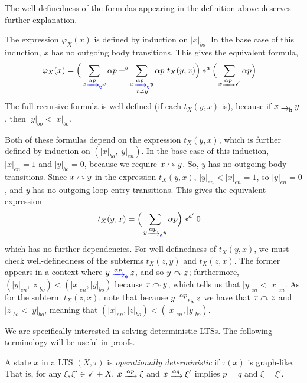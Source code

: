 \documentclass[orivec,envcountsect,envcountsame]{llncs}
\begin{document}
The well-definedness of the formulas appearing in the definition above deserves further explanation.

The expression \(\varphi_X(x)\) is defined by induction on \(|x|_{bo}\).
In the base case of this induction, \(x\) has no outgoing body transitions.
This gives the equivalent formula,
\begin{align*}
	\varphi_X(x)
	&= \Big(\sum_{x \etr{\alpha p} x} \alpha p +^b \sum_{\substack{x \etr{\alpha p} y\\x\neq y}} \alpha p~t_X(y,x)\Big) *^a \Big(\sum_{x \tr{\alpha p} \checkmark} \alpha p\Big)
\end{align*}
The full recursive formula is well-defined (if each \(t_X(y, x)\) is), because if \(x \bo y\), then \(|y|_{bo} < |x|_{bo}\).

Both of these formulas depend on the expression \(t_X(y, x)\), which is further defined by induction on \((|x|_{bo}, |y|_{en})\).
In the base case of this induction, \(|x|_{en} = 1\) and \(|y|_{bo} = 0\), because we require \(x \mathrel{\curvearrowright} y\).
So, \(y\) has no outgoing body transitions.
Since \(x \mathrel{\curvearrowright} y\) in the expression \(t_X(y, x)\), \(|y|_{en} < |x|_{en} = 1\), so \(|y|_{en} = 0\), and \(y\) has no outgoing loop entry transitions.
This gives the equivalent expression
\begin{align*}
	t_X(y, x)
	&= \Big(\sum_{y \etr{\alpha p} y} \alpha p\Big)*^{a'} 0
\end{align*}
which has no further dependencies.
For well-definedness of \(t_X(y, x)\), we must check well-definedness of the subterms \(t_X(z, y)\) and \(t_X(z,x)\).
The former appears in a context where $y \etr{\alpha p} z$, and so $y \mathrel{\curvearrowright} z$; furthermore, $(|y|_{en}, |z|_{bo}) < (|x|_{en}, |y|_{bo})$ because $x \mathrel{\curvearrowright} y$, which tells us that $|y|_{en} < |x|_{en}$.
As for the subterm $t_X(z, x)$, note that because $y \btr{\alpha p} z$ we have that $x \mathrel{\curvearrowright} z$ and $|z|_{bo} < |y|_{bo}$, meaning that $(|x|_{en}, |z|_{bo}) < (|x|_{en}, |y|_{bo})$.

We are specifically interested in solving deterministic LTSs.
The following terminology will be useful in proofs.

\begin{definition}
	A state \(x\) in a LTS \((X, \tau)\) is \emph{operationally deterministic} if \(\tau(x)\) is graph-like.
	That is, for any \(\xi,\xi' \in \checkmark + X\), \(x \tr{\alpha p} \xi\) and \(x \tr{\alpha q} \xi'\) implies \(p = q\) and \(\xi = \xi'\).
\end{definition}
\end{document}
